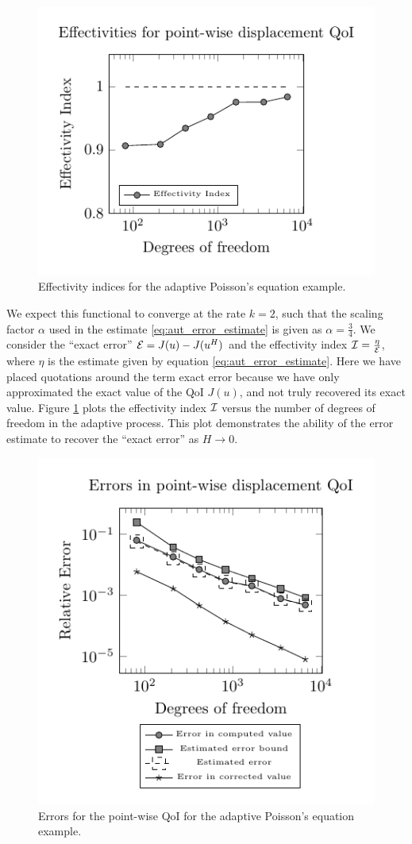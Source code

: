 %
\begin{figure}[ht!]
\centering
\includegraphics[width=.75\textwidth]{img/aut_squarehole_effectivity.pdf}
\caption{Effectivity indices for the adaptive Poisson's equation example.}
\label{fig:aut_squarehole_effectivity}
\end{figure}

We expect this functional to converge
at the rate $k=2$, such that the scaling factor $\alpha$ used in
the estimate \eqref{eq:aut_error_estimate} is given as
$\alpha = \frac34$. We consider the ``exact error''
$\mathcal{E} = J(u) - J(u^H)$ and the effectivity index
$\mathcal{I} = \frac{\eta}{\mathcal{E}}$, where $\eta$ is the estimate given by
equation \eqref{eq:aut_error_estimate}. Here we have placed quotations
around the term exact error because we have only approximated the
exact value of the QoI $J(u)$, and not truly recovered its exact value.
Figure \ref{fig:aut_squarehole_effectivity} plots the effectivity index
$\mathcal{I}$ versus the number of degrees of freedom in the adaptive
process. This plot demonstrates the ability of the error
estimate to recover the ``exact error'' as $H \to 0$.

%
\begin{figure}[ht!]
\centering
\includegraphics[width=.75\textwidth]{img/aut_squarehole_error.pdf}
\caption{Errors for the point-wise QoI for the adaptive Poisson's equation
example.}
\label{fig:aut_squarehole_error}
\end{figure}

